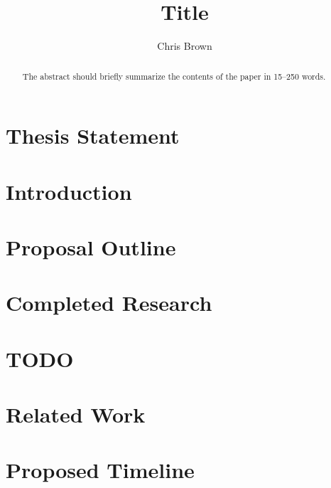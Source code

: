\documentclass[runningheads]{llncs}
\begin{document}
%
\title{Title}
%
%
\author{Chris Brown}
%
%
%
\maketitle              %
%
\begin{abstract}
The abstract should briefly summarize the contents of the paper in
15--250 words.

\end{abstract}
%
%
\section{Thesis Statement}

\section{Introduction}

\section{Proposal Outline}

\section{Completed Research}

\section{TODO}

\section{Related Work}

\section{Proposed Timeline}
\end{document}
